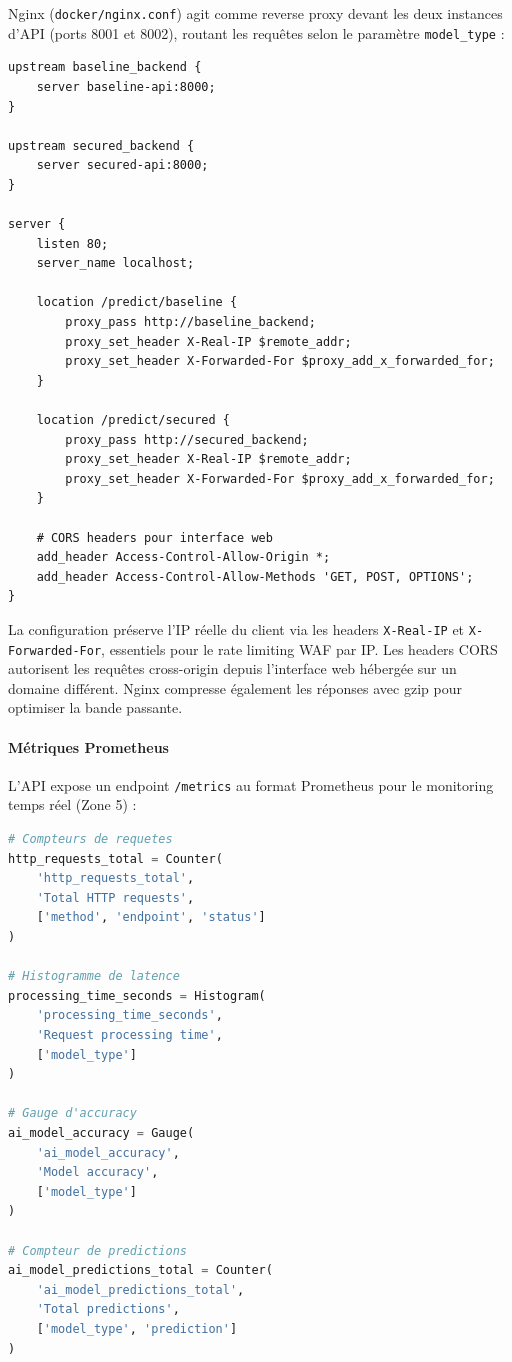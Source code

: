 Nginx (\texttt{docker/nginx.conf}) agit comme reverse proxy devant les deux instances d'API (ports 8001 et 8002), routant les requêtes selon le paramètre \texttt{model\_type} :

\begin{lstlisting}[language=nginx, caption=Configuration Nginx (extrait)]
upstream baseline_backend {
    server baseline-api:8000;
}

upstream secured_backend {
    server secured-api:8000;
}

server {
    listen 80;
    server_name localhost;

    location /predict/baseline {
        proxy_pass http://baseline_backend;
        proxy_set_header X-Real-IP $remote_addr;
        proxy_set_header X-Forwarded-For $proxy_add_x_forwarded_for;
    }

    location /predict/secured {
        proxy_pass http://secured_backend;
        proxy_set_header X-Real-IP $remote_addr;
        proxy_set_header X-Forwarded-For $proxy_add_x_forwarded_for;
    }

    # CORS headers pour interface web
    add_header Access-Control-Allow-Origin *;
    add_header Access-Control-Allow-Methods 'GET, POST, OPTIONS';
}
\end{lstlisting}

La configuration préserve l'IP réelle du client via les headers \texttt{X-Real-IP} et \texttt{X-Forwarded-For}, essentiels pour le rate limiting WAF par IP. Les headers CORS autorisent les requêtes cross-origin depuis l'interface web hébergée sur un domaine différent. Nginx compresse également les réponses avec gzip pour optimiser la bande passante.

\paragraph{Métriques Prometheus}

L'API expose un endpoint \texttt{/metrics} au format Prometheus pour le monitoring temps réel (Zone 5) :

\begin{lstlisting}[language=Python, caption=Métriques Prometheus exportées]
# Compteurs de requetes
http_requests_total = Counter(
    'http_requests_total',
    'Total HTTP requests',
    ['method', 'endpoint', 'status']
)

# Histogramme de latence
processing_time_seconds = Histogram(
    'processing_time_seconds',
    'Request processing time',
    ['model_type']
)

# Gauge d'accuracy
ai_model_accuracy = Gauge(
    'ai_model_accuracy',
    'Model accuracy',
    ['model_type']
)

# Compteur de predictions
ai_model_predictions_total = Counter(
    'ai_model_predictions_total',
    'Total predictions',
    ['model_type', 'prediction']
)
\end{lstlisting}

